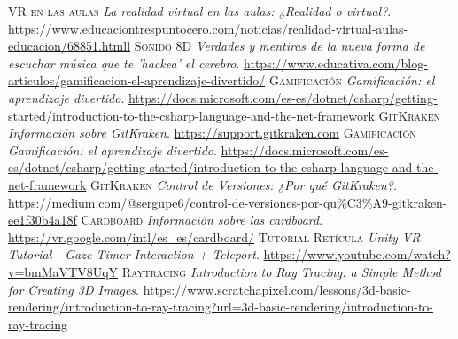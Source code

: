 \begin{thebibliography}{99}
			\textsc{VR en las aulas}
			\textit{La realidad virtual en las aulas: ¿Realidad o virtual?}.
			\newline
			\url{https://www.educaciontrespuntocero.com/noticias/realidad-virtual-aulas-educacion/68851.htmll}	
			\textsc{Sonido 8D}
			\textit{Verdades y mentiras de la nueva forma de escuchar música que te 'hackea' el cerebro}.
			\newline
			\url{https://www.educativa.com/blog-articulos/gamificacion-el-aprendizaje-divertido/}		
			\textsc{Gamificación}
			\textit{Gamificación: el aprendizaje divertido}.
			\newline
			\url{https://docs.microsoft.com/es-es/dotnet/csharp/getting-started/introduction-to-the-csharp-language-and-the-net-framework}
			\textsc{GitKraken}
			\textit{Información sobre GitKraken}.
			\newline
			\url{https://support.gitkraken.com}
			\textsc{Gamificación}
			\textit{Gamificación: el aprendizaje divertido}.
			\newline
			\url{https://docs.microsoft.com/es-es/dotnet/csharp/getting-started/introduction-to-the-csharp-language-and-the-net-framework}
			\textsc{GitKraken}
			\textit{Control de Versiones: ¿Por qué GitKraken?}.
			\newline
			\url{https://medium.com/@sergupe6/control-de-versiones-por-qu%C3%A9-gitkraken-ee1f30b4a18f}
			\textsc{Cardboard}
			\textit{Información sobre las cardboard}.
			\newline
			\url{https://vr.google.com/intl/es_es/cardboard/}
			\textsc{Tutorial Retícula}
			\textit{Unity VR Tutorial - Gaze Timer Interaction + Teleport}.
			\newline
			\url{https://www.youtube.com/watch?v=bmMaVTV8UqY}
			\textsc{Raytracing}
			\textit{Introduction to Ray Tracing: a Simple Method for Creating 3D Images}.
			\newline
			\url{https://www.scratchapixel.com/lessons/3d-basic-rendering/introduction-to-ray-tracing?url=3d-basic-rendering/introduction-to-ray-tracing}


	\end{thebibliography}

	



	
